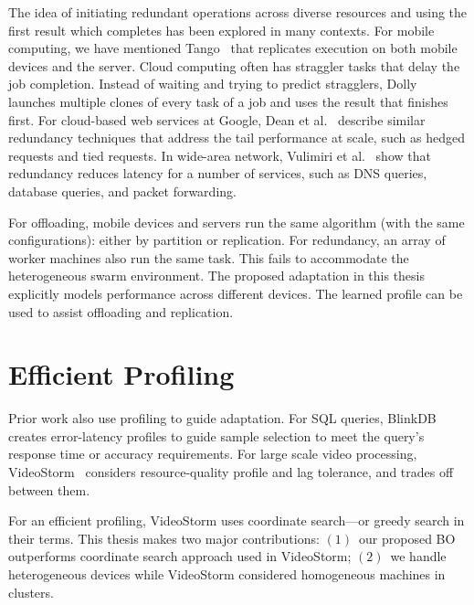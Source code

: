 \documentclass[thesis.tex]{subfiles}
\begin{document}
 The idea of initiating
redundant operations across diverse resources and using the first result which
completes has been explored in many contexts. For mobile computing, we have
mentioned Tango~\cite{gordon2015accelerating} that replicates execution on both
mobile devices and the server. Cloud computing often has straggler tasks that
delay the job completion. Instead of waiting and trying to predict stragglers,
Dolly~\cite{ananthanarayanan2013effective} launches multiple clones of every
task of a job and uses the result that finishes first. For cloud-based web
services at Google, Dean et al.~\cite{dean2013tail} describe similar redundancy
techniques that address the tail performance at scale, such as hedged requests
and tied requests. In wide-area network, Vulimiri et al.~\cite{vulimiri2013low}
show that redundancy reduces latency for a number of services, such as DNS
queries, database queries, and packet forwarding.

For offloading, mobile devices and servers run the same algorithm (with the same
configurations): either by partition or replication.  For redundancy, an array
of worker machines also run the same task. This fails to accommodate the
heterogeneous swarm environment. The proposed adaptation in this thesis
explicitly models performance across different devices. The learned profile can
be used to assist offloading and replication.

\section{Efficient Profiling}
\label{sec:prof-with-effic}

Prior work also use profiling to guide adaptation. For SQL queries, BlinkDB
creates error-latency profiles to guide sample selection to meet the query's
response time or accuracy requirements. For large scale video processing,
VideoStorm~\cite{zhang2017live} considers resource-quality profile and lag
tolerance, and trades off between them.

For an efficient profiling, VideoStorm uses coordinate search---or greedy search
in their terms. This thesis makes two major contributions: $(1)$~our proposed BO
outperforms coordinate search approach used in VideoStorm; $(2)$~we handle
heterogeneous devices while VideoStorm considered homogeneous machines in
clusters.
\end{document}
